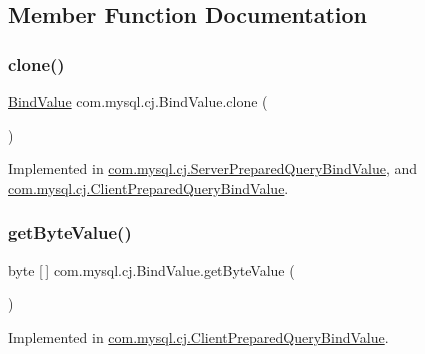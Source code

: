 \subsection{Member Function Documentation}
\mbox{\label{interfacecom_1_1mysql_1_1cj_1_1_bind_value_a89f1df9d90be93c8b8e446c264481303}} 
\subsubsection{\texorpdfstring{clone()}{clone()}}
{\footnotesize\ttfamily \mbox{\hyperlink{interfacecom_1_1mysql_1_1cj_1_1_bind_value}{Bind\+Value}} com.\+mysql.\+cj.\+Bind\+Value.\+clone (\begin{DoxyParamCaption}{ }\end{DoxyParamCaption})}



Implemented in \mbox{\hyperlink{classcom_1_1mysql_1_1cj_1_1_server_prepared_query_bind_value_a39d3a4826771b5a98c108bcbfd630d0f}{com.\+mysql.\+cj.\+Server\+Prepared\+Query\+Bind\+Value}}, and \mbox{\hyperlink{classcom_1_1mysql_1_1cj_1_1_client_prepared_query_bind_value_a4ff631107a4d41eee8c901b7085c281f}{com.\+mysql.\+cj.\+Client\+Prepared\+Query\+Bind\+Value}}.

\mbox{\label{interfacecom_1_1mysql_1_1cj_1_1_bind_value_a10d85fd3edb20a2c63250127d08cdcd3}} 
\subsubsection{\texorpdfstring{get\+Byte\+Value()}{getByteValue()}}
{\footnotesize\ttfamily byte \mbox{[}$\,$\mbox{]} com.\+mysql.\+cj.\+Bind\+Value.\+get\+Byte\+Value (\begin{DoxyParamCaption}{ }\end{DoxyParamCaption})}



Implemented in \mbox{\hyperlink{classcom_1_1mysql_1_1cj_1_1_client_prepared_query_bind_value_a4bd862b93770f5f4eca133257026a10c}{com.\+mysql.\+cj.\+Client\+Prepared\+Query\+Bind\+Value}}.

